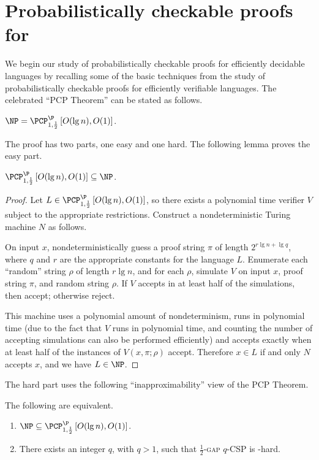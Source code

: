 \documentclass[]{article}
\newcommand{\PCPcs}[5]{\PCP^{#1}_{#2, #3}\left[#4, #5\right]}
\begin{document}
\section{Probabilistically checkable proofs for \texorpdfstring{\NP}{NP}}

We begin our study of probabilistically checkable proofs for efficiently decidable languages by recalling some of the basic techniques from the study of probabilistically checkable proofs for efficiently verifiable languages.
The celebrated ``PCP Theorem'' can be stated as follows.

\begin{theorem}
  $\NP = \PCPcs{\P}{1}{\frac{1}{2}}{O(\lg n)}{O(1)}$.
\end{theorem}

The proof has two parts, one easy and one hard.
The following lemma proves the easy part.

\begin{lemma}\label{lem:pcpinnp}
  $\PCPcs{\P}{1}{\frac{1}{2}}{O(\lg n)}{O(1)} \subseteq \NP$.
\end{lemma}
\begin{proof}
  Let $L \in \PCPcs{\P}{1}{\frac{1}{2}}{O(\lg n)}{O(1)}$, so there exists a polynomial time \PCP{} verifier $V$ subject to the appropriate restrictions.
  Construct a nondeterministic Turing machine $N$ as follows.

  On input $x$, nondeterministically guess a proof string $\pi$ of length $2^{r \lg n + \lg q}$, where $q$ and $r$ are the appropriate constants for the language $L$.
  Enumerate each ``random'' string $\rho$ of length $r \lg  n$, and for each $\rho$, simulate $V$ on input $x$, proof string $\pi$, and random string $\rho$.
  If $V$ accepts in at least half of the simulations, then accept; otherwise reject.

  This machine uses a polynomial amount of nondeterminism, runs in polynomial time (due to the fact that $V$ runs in polynomial time, and counting the number of accepting simulations can also be performed efficiently) and accepts exactly when at least half of the instances of $V(x, \pi; \rho)$ accept.
  Therefore $x \in L$ if and only $N$ accepts $x$, and we have $L \in \NP$.  
\end{proof}

The hard part uses the following ``inapproximability'' view of the PCP Theorem.
\begin{proposition}\label{prop:equivalence}
  The following are equivalent.
  \begin{enumerate}
  \item $\NP \subseteq \PCPcs{\P}{1}{\frac{1}{2}}{O(\lg n)}{O(1)}$.
  \item There exists an integer $q$, with $q > 1$, such that \textsc{$\frac{1}{2}$-gap $q$-CSP} is \NP-hard.
  \end{enumerate}
\end{proposition}
\end{document}
